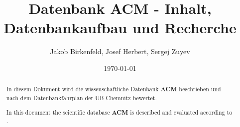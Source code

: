 \documentclass[
	ngerman,
	parskip=half,
	headsepline,
	fontsize=12pt,
	DIV=13,
	listof=leveldown,
	]{scrreprt}
\author{Jakob Birkenfeld, Josef Herbert, Sergej Zuyev}
\title{Datenbank ACM - Inhalt, Datenbankaufbau und Recherche}
\date{\today}
\begin{document}
	\begin{titlepage}
		\maketitle
	\end{titlepage}
	
	\begin{abstract}
		In diesem Dokument wird die wissenschaftliche Datenbank \textbf{ACM} beschrieben und nach dem Datenbankfahrplan der UB Chemnitz \cite{resource:dbf} bewertet.
		
		In this document the scientific database \textbf{ACM} is described and evaluated according to \cite{resource:dbf}.
	\end{abstract}

	\clearpage
	
		\tableofcontents
		\listoffigures	
	
	\clearpage
	
\end{document}
